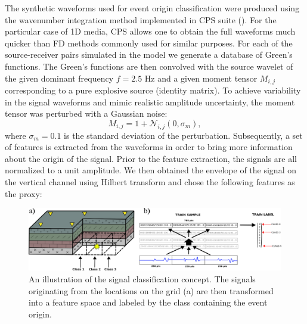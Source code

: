 \documentclass[letterpaper,11pt]{article}
\begin{document}
The synthetic waveforms used for event origin classification were produced using the wavenumber integration method implemented in CPS suite (\cite{herrmann_computer_2013}). For the particular case of 1D media, CPS allows one to obtain the full waveforms much quicker than FD methods commonly used for similar purposes. For each of the source-receiver pairs simulated in the model we generate a database of Green's functions. The Green's functions are then convolved with the source wavelet of the given dominant frequency $f=2.5$ Hz and a given moment tensor $M_{i,j}$ corresponding to a pure explosive source (identity matrix). To achieve variability in the signal waveforms and mimic realistic amplitude uncertainty, the moment tensor was perturbed with a Gaussian noise:
\begin{equation}
 M_{i,j} = 1 + \mathcal{N}_{i,j}(0,\sigma_{m}),
\end{equation}
where $\sigma_{m} = 0.1$ is the standard deviation of the perturbation. Subsequently, a set of features is extracted from the waveforms in order to bring more information about the origin of the signal. Prior to the feature extraction, the signals are all normalized to a unit amplitude. We then obtained the envelope of the signal on the vertical channel using Hilbert transform and chose the following features as the proxy:
\begin{figure}[htb]
\begin{center}
\includegraphics[width=0.7\linewidth,angle=0]{./AntonBiryukov_bibtex/classes.png}
\end{center}
\vspace{-4mm}
\caption{An illustration of the signal classification concept. The signals originating from the locations on the grid (a) are then transformed into a feature space and labeled by the class containing the event origin.}
\label{fig:classes}
\end{figure}
\end{document}
